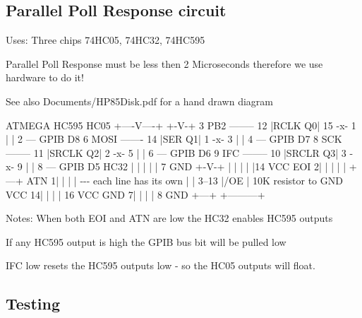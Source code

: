 \begin{DoxyItemize}
\end{DoxyItemize}





\subsection*{Parallel Poll Response circuit}


\begin{DoxyItemize}
\item Uses\+: Three chips 74\+H\+C05, 74\+H\+C32, 74\+H\+C595
\item Parallel Poll Response must be less then 2 Microseconds therefore we use hardware to do it!
\item \begin{DoxySeeAlso}{See also}
Documents/\+H\+P85\+Disk.\+pdf for a hand drawn diagram
\end{DoxySeeAlso}

\begin{DoxyPre}
    ATMEGA               HC595             HC05 
                      +----V----+          +-V-+  
    3 PB2 -------- 12 |RCLK   Q0| 15 -x- 1 |   | 2 --- GPIB D8 
    6 MOSI ------- 14 |SER    Q1| 1  -x- 3 |   | 4 --- GPIB D7 
    8 SCK -------- 11 |SRCLK  Q2| 2  -x- 5 |   | 6 --- GPIB D6 
    9 IFC -------- 10 |SRCLR  Q3| 3  -x- 9 |   | 8 --- GPIB D5 
           HC32       |         |     |    |   | 7 GND 
          +-V-+       |         |     |    |   |14 VCC 
     EOI 2|   |       |         |     |    +---+ 
     ATN 1|   |       |         |     -\/-\/-\/ each line has its own 
          |   | 3--13 |/OE      |          10K resistor to GND 
    VCC 14|   |       |         | 16 VCC 
    GND  7|   |       |         |  8 GND 
          +---+       +---------+ 
\end{DoxyPre}

\end{DoxyItemize}

Notes\+: When both E\+OI and A\+TN are low the H\+C32 enables H\+C595 outputs
\begin{DoxyItemize}
\item If any H\+C595 output is high the G\+P\+IB bus bit will be pulled low
\item I\+FC low resets the H\+C595 outputs low -\/ so the H\+C05 outputs will float.
\end{DoxyItemize}





\subsection*{Testing}


